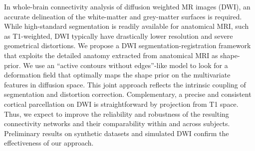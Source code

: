 In whole-brain connectivity analysis of diffusion weighted MR images (DWI),
an accurate delineation of the white-matter and grey-matter surfaces is required.
While high-standard segmentation is readily available for anatomical MRI, such 
as T1-weighted, DWI typically have drastically lower resolution and severe 
geometrical distortions. We propose a DWI segmentation-registration framework 
that exploits the detailed anatomy extracted from anatomical MRI as shape-prior.
We use an ``active contours without edges''-like model to look for a deformation
field that optimally maps the shape prior on the multivariate features 
in diffusion space. This joint approach reflects the intrinsic coupling of 
segmentation and distortion correction. Complementary, a precise and consistent
cortical parcellation on DWI is straightforward by projection from T1 space. Thus,
we expect to improve the reliability and robustness of the resulting connectivity 
networks and their comparability within and across subjects. Preliminary results 
on synthetic datasets and simulated DWI confirm the effectiveness of our approach.